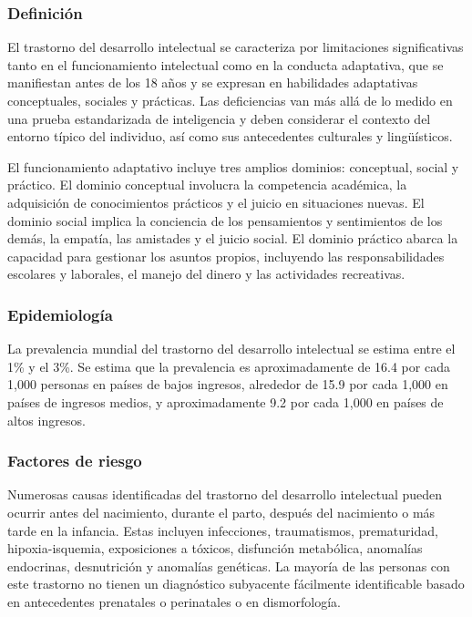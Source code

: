 \documentclass[11pt,letterpaper]{report}
\begin{document}
\subsubsection{Definición}
El trastorno del desarrollo intelectual se caracteriza por limitaciones 
significativas tanto en el funcionamiento intelectual como en la conducta 
adaptativa, que se manifiestan antes de los 18 años y se expresan en 
habilidades adaptativas conceptuales, sociales y prácticas. Las deficiencias 
van más allá de lo medido en una prueba estandarizada de inteligencia y deben 
considerar el contexto del entorno típico del individuo, así como sus 
antecedentes culturales y lingüísticos. \cite{Simms2023}

El funcionamiento adaptativo incluye tres amplios dominios: conceptual, social
y práctico. El dominio conceptual involucra la competencia académica, la
adquisición de conocimientos prácticos y el juicio en situaciones nuevas. El
dominio social implica la conciencia de los pensamientos y sentimientos de los
demás, la empatía, las amistades y el juicio social. El dominio práctico abarca
la capacidad para gestionar los asuntos propios, incluyendo las
responsabilidades escolares y laborales, el manejo del dinero y las
actividades recreativas. \cite{Simms2023}

\subsubsection{Epidemiología}
La prevalencia mundial del trastorno del desarrollo intelectual se estima
entre el 1\% y el 3\%. Se estima que la prevalencia es aproximadamente de 16.4
por cada 1,000 personas en países de bajos ingresos, alrededor de 15.9 por cada
1,000 en países de ingresos medios, y aproximadamente 9.2 por cada 1,000 en
países de altos ingresos. \cite{vanKarnebeek2018, Nelson56}

\subsubsection{Factores de riesgo}
Numerosas causas identificadas del trastorno del desarrollo intelectual pueden
ocurrir antes del nacimiento, durante el parto, después del nacimiento o más 
tarde en la infancia. Estas incluyen infecciones, traumatismos, prematuridad,
hipoxia-isquemia, exposiciones a tóxicos, disfunción metabólica, anomalías
endocrinas, desnutrición y anomalías genéticas. La mayoría de las personas con
este trastorno no tienen un diagnóstico subyacente fácilmente identificable
basado en antecedentes prenatales o perinatales o en dismorfología.
\cite{Nelson56}
\end{document}
